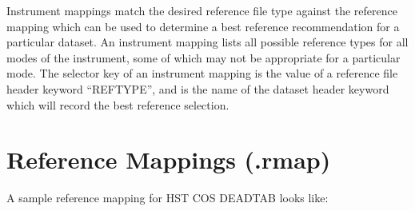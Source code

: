 \documentclass[letterpaper,10pt,english]{sphinxmanual}
\begin{document}
Instrument mappings match the desired reference file type against the reference mapping which can be used to determine a
best reference recommendation for a particular dataset.  An instrument mapping lists all possible reference types for
all modes of the instrument,  some of which may not be appropriate for a particular mode.   The selector key of an
instrument mapping is the value of a reference file header keyword ``REFTYPE'',  and is the name of the dataset header
keyword which will record the best reference selection.


\section{Reference Mappings (.rmap)}
\label{rmap_syntax:reference-mappings-rmap}
A sample reference mapping for HST COS DEADTAB looks like:
\end{document}
